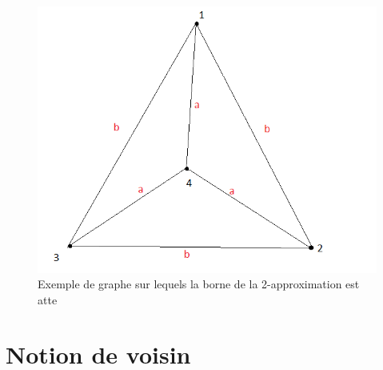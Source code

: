 \documentclass[10pt,a4paper]{article}
\begin{document}
\begin{figure}
\includegraphics[scale=.5]{images/exemple_borne}
\caption{Exemple de graphe sur lequels la borne de la 2-approximation est atte}
\label{exborne}
\end{figure}
\section{Notion de voisin}
\end{document}
